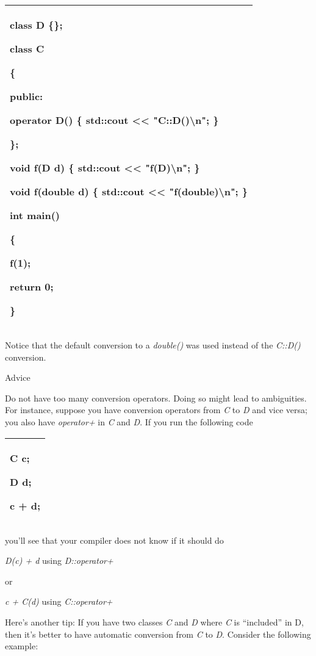 \documentclass[
]{article}
\begin{document}
\begin{longtable}[]{@{}l@{}}
\toprule
\endhead
\begin{minipage}[t]{0.97\columnwidth}\raggedright
class D \{\};

class C

\{

public:

operator D() \{ std::cout \textless\textless{} "C::D()\textbackslash n";
\}

\};

void f(D d) \{ std::cout \textless\textless{} "f(D)\textbackslash n"; \}

void f(double d) \{ std::cout \textless\textless{}
"f(double)\textbackslash n"; \}

int main()

\{

f(1);

return 0;

\}\strut
\end{minipage}\tabularnewline
\bottomrule
\end{longtable}

Notice that the default conversion to a \emph{double() }was used instead
of the \emph{C::D() }conversion.

Advice

Do not have too many conversion operators. Doing so might lead to
ambiguities. For instance, suppose you have conversion operators from
\emph{C} to \emph{D} and vice versa; you also have \emph{operator+} in
\emph{C} and \emph{D}. If you run the following code

\begin{longtable}[]{@{}l@{}}
\toprule
\endhead
\begin{minipage}[t]{0.97\columnwidth}\raggedright
C c;

D d;

c + d;\strut
\end{minipage}\tabularnewline
\bottomrule
\end{longtable}

you'll see that your compiler does not know if it should do

\emph{D(c) + d }using\emph{ D::operator+}

or\emph{ }

\emph{c + C(d) }using\emph{ C::operator+}

Here's another tip: If you have two classes \emph{C} and \emph{D} where
\emph{C} is ``included'' in D, then it's better to have automatic
conversion from \emph{C} to \emph{D}. Consider the following example:
\end{document}
